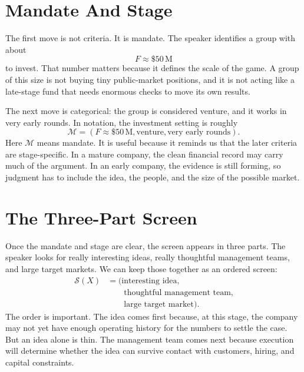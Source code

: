 \section{Mandate And Stage}

The first move is not criteria. It is mandate. The speaker identifies a group with about
\begin{equation}
F \approx \$50\,\mathrm{M}
\end{equation}
to invest. That number matters because it defines the scale of the game. A group of this size is not buying tiny public-market positions, and it is not acting like a late-stage fund that needs enormous checks to move its own results.

The next move is categorical: the group is considered venture, and it works in very early rounds. In notation, the investment setting is roughly
\begin{equation}
\mathcal{M}
=
\left(
F \approx \$50\,\mathrm{M},
\text{venture},
\text{very early rounds}
\right).
\end{equation}
Here \(\mathcal{M}\) means mandate. It is useful because it reminds us that the later criteria are stage-specific. In a mature company, the clean financial record may carry much of the argument. In an early company, the evidence is still forming, so judgment has to include the idea, the people, and the size of the possible market.

\section{The Three-Part Screen}

Once the mandate and stage are clear, the screen appears in three parts. The speaker looks for really interesting ideas, really thoughtful management teams, and large target markets. We can keep those together as an ordered screen:
\begin{align}
\mathcal{S}(X)
&=
\bigl(
\text{interesting idea}, \nonumber\\
&\qquad
\text{thoughtful management team}, \nonumber\\
&\qquad
\text{large target market}
\bigr).
\end{align}
The order is important. The idea comes first because, at this stage, the company may not yet have enough operating history for the numbers to settle the case. But an idea alone is thin. The management team comes next because execution will determine whether the idea can survive contact with customers, hiring, and capital constraints.

